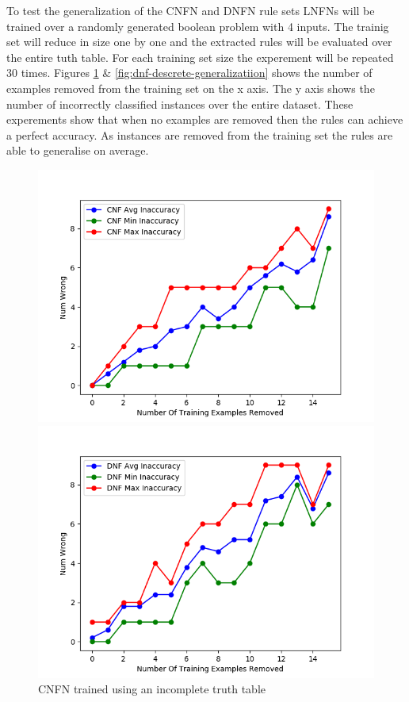 To test the generalization of the CNFN and DNFN rule sets LNFNs will be trained over a randomly generated boolean problem with 4 inputs. The trainig set will reduce in size one by one and the extracted rules will be evaluated over the entire tuth table. For each training set size the experement will be repeated 30 times. Figures \ref{fig:cnf-descrete-generalizatiion} \& \ref{fig:dnf-descrete-generalizatiion} shows the number of examples removed from the training set on the x axis. The y axis shows the number of incorrectly classified instances over the entire dataset. These experements show that when no examples are removed then the rules can achieve a perfect accuracy. As instances are removed from the training set the rules are able to generalise on average. 

\begin{figure}[H]
	\centering
	\begin{minipage}[b]{0.45\textwidth}
		\includegraphics[width=\textwidth]{cnf-descrete-generalization.png}
		\caption{CNFN trained using an incomplete truth table}
		\label{fig:cnf-descrete-generalizatiion}
	\end{minipage}
	\begin{minipage}[b]{0.45\textwidth}
		\includegraphics[width=\textwidth]{dnf-descrete-generalization.png}

\end{minipage}
\end{figure}
